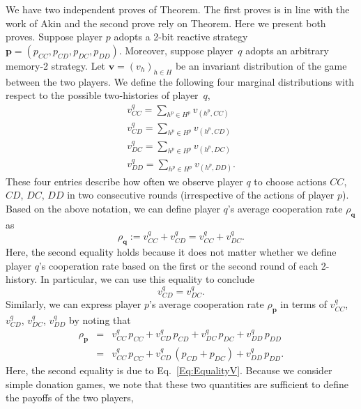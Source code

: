 \documentclass{article}
\theoremstyle{definition}
\begin{document}
We have two independent proves of Theorem. The first proves is in line with the
work of Akin and the second prove rely on Theorem. Here we present both proves.
Suppose player $p$ adopts a 2-bit reactive strategy $\mathbf{p}\!=\!(p_{CC},p_{CD}, p_{DC}, p_{DD})$. 
Moreover, suppose player~$q$ adopts an arbitrary memory-2 strategy. 
Let $\mathbf{v}=(v_h)_{h\in H}$ be an invariant distribution of the game between the two players. 
We define the following four marginal distributions with respect to the possible two-histories of player~$q$, 
\begin{equation}
\begin{array}{l}
\displaystyle v^q_{CC} = \sum_{h^p\in H^p} v_{(h^p,CC)}\\
\displaystyle v^q_{CD} = \sum_{h^p\in H^p} v_{(h^p,CD)}\\
\displaystyle v^q_{DC} = \sum_{h^p\in H^p} v_{(h^p,DC)}\\
\displaystyle v^q_{DD} = \sum_{h^p\in H^p} v_{(h^p,DD)}.
\end{array}
\end{equation}
These four entries describe how often we observe player $q$ to choose actions $CC$, $CD$, $DC$, $DD$ in two consecutive rounds (irrespective of the actions of player $p$). Based on the above notation, we can define player $q$'s average cooperation rate $\rho_\mathbf{q}$ as 
\begin{equation} \label{Eq:rhoq}
\rho_\mathbf{q} := v^q_{CC} + v^q_{CD} = v^q_{CC} + v^q_{DC}.
\end{equation}
Here, the second equality holds because it does not matter whether we define player $q$'s cooperation rate based on the first or the second round of each 2-history. In particular, we can use this equality to conclude
\begin{equation} \label{Eq:EqualityV}
v^q_{CD} = v^q_{DC}.
\end{equation}
Similarly, we can express player $p$'s average cooperation rate $\rho_\mathbf{p}$ in terms of $v^q_{CC}$, $v^q_{CD}$, $v^q_{DC}$, $v^q_{DD}$ by noting that 
\begin{equation} \label{Eq:rhop}
\begin{array}{lll}
\rho_\mathbf{p} &= &\displaystyle v^q_{CC}\, p_{CC} +  v^q_{CD}\,p_{CD} + v^q_{DC}\, p_{DC} + v^q_{DD}\, p_{DD}\\[0.2cm]
	& =  &v^q_{CC}\, p_{CC} +  v^q_{CD}\,(p_{CD}\!+\!p_{DC}) + v^q_{DD}\, p_{DD}.
\end{array}
\end{equation}
Here, the second equality is due to Eq.~\eqref{Eq:EqualityV}. Because we consider simple donation games, we note that these two quantities are sufficient to define the payoffs of the two players, 
\end{document}

